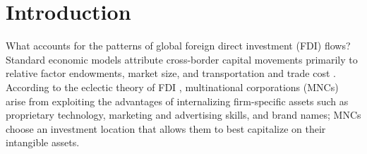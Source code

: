 \documentclass[reqno,onecolumn,letterpaper,12pt]{article}
\begin{document}


\clearpage
\doublespacing
\setcounter{page}{1}
\section{Introduction}


What accounts for the patterns of global foreign direct investment (FDI) flows? Standard economic models attribute cross-border capital movements primarily to relative factor endowments, market size, and transportation and trade cost \citep{Helpman:1984,Carr_et_al:2001}.
According to the eclectic theory of FDI \citep{Dunning:1988,Dunning:1992}, multinational corporations (MNCs) arise from exploiting the advantages of internalizing firm-specific assets such as proprietary technology, marketing and advertising skills, and brand names; MNCs choose an investment location that allows them to best capitalize on their intangible assets.

\end{document}
